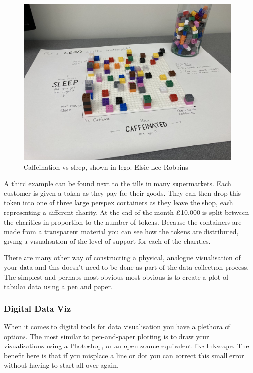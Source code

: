 \documentclass[
  12pt,
]{book}
\begin{document}
\begin{figure}
\includegraphics[width=1\linewidth]{images/303-data-visualisation/lego-coffee} \caption{Caffeination vs sleep, shown in lego. Elsie Lee-Robbins}\label{fig:unnamed-chunk-3}
\end{figure}

A third example can be found next to the tills in many supermarkets. Each customer is given a token as they pay for their goods. They can then drop this token into one of three large perspex containers as they leave the shop, each representing a different charity. At the end of the month £10,000 is split between the charities in proportion to the number of tokens. Because the containers are made from a transparent material you can see how the tokens are distributed, giving a visualisation of the level of support for each of the charities.

There are many other way of constructing a physical, analogue visualisation of your data and this doesn't need to be done as part of the data collection process. The simplest and perhaps most obvious most obvious is to create a plot of tabular data using a pen and paper.

\hypertarget{digital-data-viz}{%
\subsubsection{Digital Data Viz}\label{digital-data-viz}}

When it comes to digital tools for data visualisation you have a plethora of options. The most similar to pen-and-paper plotting is to draw your visualisations using a Photoshop, or an open source equivalent like Inkscape. The benefit here is that if you misplace a line or dot you can correct this small error without having to start all over again.
\end{document}
